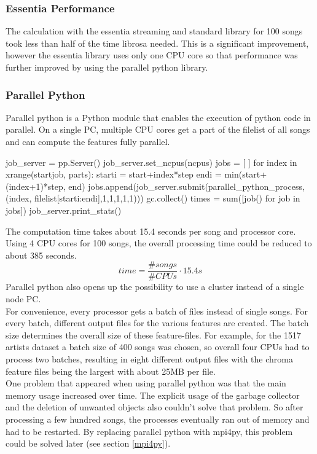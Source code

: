 \subsubsection{Essentia Performance}

The calculation with the essentia streaming and standard library for 100 songs took less than half of the time librosa needed. This is a significant improvement, however the essentia library uses only one CPU core so that performance was further improved by using the parallel python library.

\subsubsection{Parallel Python}

Parallel python is a Python module that enables the execution of python code in parallel. On a single PC, multiple CPU cores get a part of the filelist of all songs and can compute the features fully parallel.
\begin{pythonCode}[frame=single,label={lst:pp},caption={parallel python},captionpos=b]
job_server = pp.Server()
job_server.set_ncpus(ncpus)
jobs = [ ]
for index in xrange(startjob, parts):
	starti = start+index*step
	endi = min(start+(index+1)*step, end)
	jobs.append(job_server.submit(parallel_python_process, (index, 
		filelist[starti:endi],1,1,1,1,1)))
	gc.collect()
times = sum([job() for job in jobs])
job_server.print_stats()
\end{pythonCode}
The computation time takes about 15.4 seconds per song and processor core. Using 4 CPU cores for 100 songs, the overall processing time could be reduced to about 385 seconds. 
\begin{equation} \label{eq:parallelp}
time = \frac{\#songs}{\#CPUs} \cdot 15.4s
\end{equation}
Parallel python also opens up the possibility to use a cluster instead of a single node PC.\\
For convenience, every processor gets a batch of files instead of single songs. For every batch, different output files for the various features are created. The batch size determines the overall size of these feature-files. For example, for the 1517 artists dataset a batch size of 400 songs was chosen, so overall four CPUs had to process two batches, resulting in eight different output files with the chroma feature files being the largest with about 25MB per file.\\
One problem that appeared when using parallel python was that the main memory usage increased over time. The explicit usage of the garbage collector and the deletion of unwanted objects also couldn't solve that problem. So after processing a few hundred songs, the processes eventually ran out of memory and had to be restarted. By replacing parallel python with mpi4py, this problem could be solved later (see section \ref{mpi4py}). 

